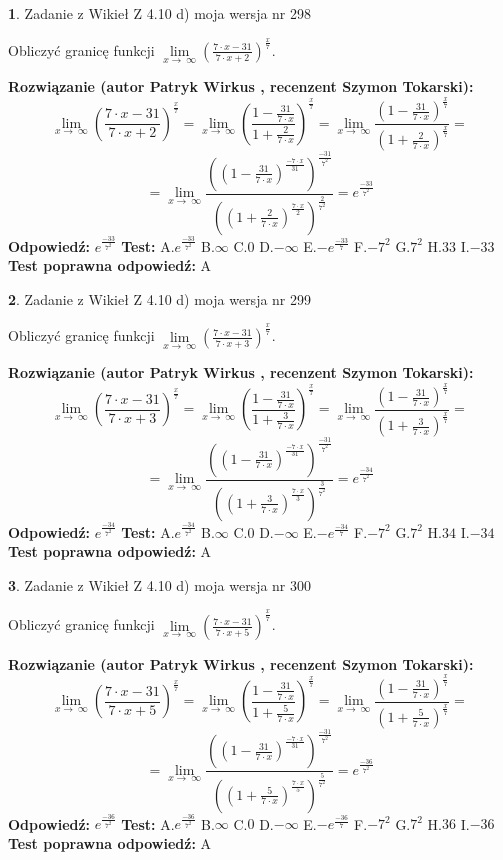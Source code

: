 \documentclass[12pt, a4paper]{article}
\theoremstyle{definition} %
\newtheorem{zad}{}
\newcommand{\zadStart}[1]{\begin{zad}#1\newline}
\newcommand{\zadStop}{\end{zad}}
\newcommand{\rozwStart}[2]{\noindent \textbf{Rozwiązanie (autor #1 , recenzent #2): }\newline}
\newcommand{\rozwStop}{\newline}
\newcommand{\odpStart}{\noindent \textbf{Odpowiedź:}\newline}
\newcommand{\odpStop}{\newline}
\newcommand{\testStart}{\noindent \textbf{Test:}\newline}
\newcommand{\testStop}{\newline}
\newcommand{\kluczStart}{\noindent \textbf{Test poprawna odpowiedź:}\newline}
\newcommand{\kluczStop}{\newline}
\begin{document}
\zadStart{Zadanie z Wikieł Z 4.10 d) moja wersja nr 298}


Obliczyć granicę funkcji  $\lim\limits_{x\to\ \infty}(\frac{7\cdot x-31}{7\cdot x+2})^{\frac{x}{7}}$.
\zadStop
\rozwStart{Patryk Wirkus}{Szymon Tokarski}
$$\lim\limits_{x\to\ \infty}(\frac{7\cdot x-31}{7\cdot x+2})^{\frac{x}{7}} = \lim\limits_{x\to\ \infty}(\frac{1-\frac{31}{7\cdot x}}{1+\frac{2}{7\cdot x}})^{\frac{x}{7}}=\lim\limits_{x\to\ \infty}\frac{(1-\frac{31}{7\cdot x})^{\frac{x}{7}}}{(1+\frac{2}{7\cdot x})^{\frac{x}{7}}}=$$
$$=\lim\limits_{x\to\ \infty}\frac{((1-\frac{31}{7\cdot x})^{\frac{-7\cdot x}{31}})^{\frac{-31}{7^{2}}}}{((1+\frac{2}{7\cdot x})^{\frac{7\cdot x}{2}})^{\frac{2}{7^{2}}}}=e^{\frac{-33}{7^{2}}}$$
\rozwStop
\odpStart
$e^{\frac{-33}{7^{2}}}$
\odpStop
\testStart
A.$e^{\frac{-33}{7^{2}}}$ B.$\infty$ C.$0$ D.$-\infty$ E.$-e^{\frac{-33}{7}}$
F.$-7^{2}$ G.$7^{2}$
H.$33$
I.$-33$
\testStop
\kluczStart
A
\kluczStop



\zadStart{Zadanie z Wikieł Z 4.10 d) moja wersja nr 299}


Obliczyć granicę funkcji  $\lim\limits_{x\to\ \infty}(\frac{7\cdot x-31}{7\cdot x+3})^{\frac{x}{7}}$.
\zadStop
\rozwStart{Patryk Wirkus}{Szymon Tokarski}
$$\lim\limits_{x\to\ \infty}(\frac{7\cdot x-31}{7\cdot x+3})^{\frac{x}{7}} = \lim\limits_{x\to\ \infty}(\frac{1-\frac{31}{7\cdot x}}{1+\frac{3}{7\cdot x}})^{\frac{x}{7}}=\lim\limits_{x\to\ \infty}\frac{(1-\frac{31}{7\cdot x})^{\frac{x}{7}}}{(1+\frac{3}{7\cdot x})^{\frac{x}{7}}}=$$
$$=\lim\limits_{x\to\ \infty}\frac{((1-\frac{31}{7\cdot x})^{\frac{-7\cdot x}{31}})^{\frac{-31}{7^{2}}}}{((1+\frac{3}{7\cdot x})^{\frac{7\cdot x}{3}})^{\frac{3}{7^{2}}}}=e^{\frac{-34}{7^{2}}}$$
\rozwStop
\odpStart
$e^{\frac{-34}{7^{2}}}$
\odpStop
\testStart
A.$e^{\frac{-34}{7^{2}}}$ B.$\infty$ C.$0$ D.$-\infty$ E.$-e^{\frac{-34}{7}}$
F.$-7^{2}$ G.$7^{2}$
H.$34$
I.$-34$
\testStop
\kluczStart
A
\kluczStop



\zadStart{Zadanie z Wikieł Z 4.10 d) moja wersja nr 300}


Obliczyć granicę funkcji  $\lim\limits_{x\to\ \infty}(\frac{7\cdot x-31}{7\cdot x+5})^{\frac{x}{7}}$.
\zadStop
\rozwStart{Patryk Wirkus}{Szymon Tokarski}
$$\lim\limits_{x\to\ \infty}(\frac{7\cdot x-31}{7\cdot x+5})^{\frac{x}{7}} = \lim\limits_{x\to\ \infty}(\frac{1-\frac{31}{7\cdot x}}{1+\frac{5}{7\cdot x}})^{\frac{x}{7}}=\lim\limits_{x\to\ \infty}\frac{(1-\frac{31}{7\cdot x})^{\frac{x}{7}}}{(1+\frac{5}{7\cdot x})^{\frac{x}{7}}}=$$
$$=\lim\limits_{x\to\ \infty}\frac{((1-\frac{31}{7\cdot x})^{\frac{-7\cdot x}{31}})^{\frac{-31}{7^{2}}}}{((1+\frac{5}{7\cdot x})^{\frac{7\cdot x}{5}})^{\frac{5}{7^{2}}}}=e^{\frac{-36}{7^{2}}}$$
\rozwStop
\odpStart
$e^{\frac{-36}{7^{2}}}$
\odpStop
\testStart
A.$e^{\frac{-36}{7^{2}}}$ B.$\infty$ C.$0$ D.$-\infty$ E.$-e^{\frac{-36}{7}}$
F.$-7^{2}$ G.$7^{2}$
H.$36$
I.$-36$
\testStop
\kluczStart
A
\kluczStop
\end{document}
